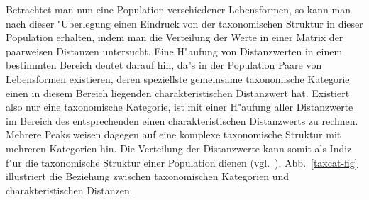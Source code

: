 Betrachtet man nun eine Population verschiedener Lebensformen, so kann man nach dieser
"Uberlegung einen Eindruck von der taxonomischen Struktur in dieser Population erhalten,
indem man die Verteilung der Werte in einer Matrix der paarweisen Distanzen untersucht.
Eine H"aufung von Distanzwerten in einem bestimmten Bereich deutet darauf hin, da"s in der
Population Paare von Lebensformen existieren, deren speziellste gemeinsame taxonomische
Kategorie einen in diesem Bereich liegenden charakteristischen Distanzwert hat. Existiert
also nur eine taxonomische Kategorie, ist mit einer H"aufung aller Distanzwerte im Bereich
des entsprechenden einen charakteristischen Distanzwerts zu rechnen. Mehrere Peaks weisen
dagegen auf eine komplexe taxonomische Struktur mit mehreren Kategorien hin. Die Verteilung
der Distanzwerte kann somit als Indiz f"ur die taxonomische Struktur einer Population dienen
(vgl.\ \cite{Higgs92}).
Abb.\ \ref{taxcat-fig} illustriert die Beziehung
zwischen taxonomischen Kategorien und charakteristischen Distanzen.

